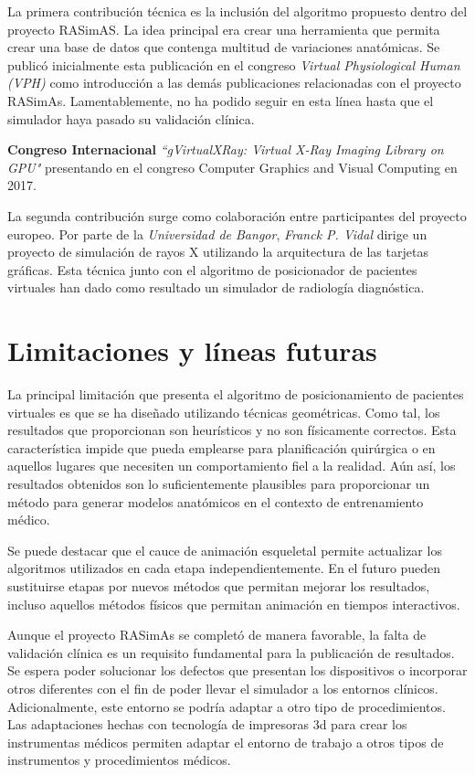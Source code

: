 La primera contribución técnica es la inclusión del algoritmo propuesto dentro del proyecto \ac{RASimAS}. La idea principal era crear una herramienta que permita crear una base de datos que contenga multitud de variaciones anatómicas.  Se publicó inicialmente esta publicación en el congreso \emph{ Virtual Physiological Human (VPH)} como introducción a las demás publicaciones relacionadas con el proyecto \ac{RASimAs}. Lamentablemente, no ha podido seguir en esta línea hasta que el simulador haya pasado su validación clínica.

\textbf{ Congreso Internacional }\emph{``gVirtualXRay: Virtual X-Ray Imaging Library on GPU"}\cite{asdf} presentando en el congreso Computer Graphics and Visual Computing en 2017.

La segunda contribución surge como colaboración entre participantes del proyecto europeo. Por parte de la \emph{Universidad de Bangor}, \emph{Franck P. Vidal} \cite{gVirtualXRay} dirige un proyecto de simulación de rayos X utilizando la arquitectura de las tarjetas gráficas. Esta técnica junto con el algoritmo de posicionador de pacientes virtuales han dado como resultado un simulador de radiología diagnóstica.




\section{Limitaciones y líneas futuras}
\label{conclu:future}
La principal limitación que presenta el algoritmo  de posicionamiento de pacientes virtuales es que se ha diseñado utilizando técnicas geométricas. Como tal, los resultados que proporcionan son heurísticos y no son físicamente correctos. Esta característica impide que pueda emplearse para planificación quirúrgica o en aquellos lugares que necesiten un comportamiento fiel a la realidad. Aún así, los resultados obtenidos son lo suficientemente plausibles para proporcionar un método para generar modelos anatómicos en el contexto de entrenamiento médico.

Se puede destacar que el cauce de animación esqueletal permite actualizar los algoritmos utilizados en cada etapa independientemente. En el futuro pueden sustituirse etapas por nuevos métodos que permitan mejorar los resultados, incluso aquellos métodos físicos que permitan animación en tiempos interactivos.

Aunque el proyecto \ac{RASimAs} se completó de manera favorable, la falta de validación clínica es un requisito fundamental para la publicación de resultados. Se espera poder solucionar los defectos que presentan los dispositivos o incorporar otros diferentes con el fin de poder llevar el simulador a los entornos clínicos.
Adicionalmente, este entorno se podría adaptar a otro tipo de procedimientos. Las adaptaciones hechas con tecnología de impresoras 3d para crear los instrumentas médicos permiten adaptar el entorno de trabajo a otros tipos de instrumentos y procedimientos médicos.

